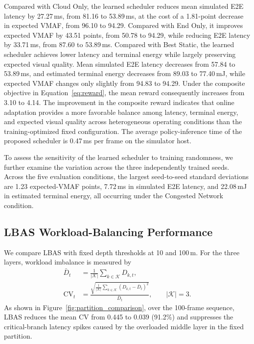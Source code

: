 \documentclass[acmsmall]{acmart}
\begin{document}
Compared with Cloud Only, the learned scheduler reduces mean simulated E2E latency by 27.27\,ms, from 81.16 to 53.89\,ms, at the cost of a 1.81-point decrease in expected VMAF, from 96.10 to 94.29. Compared with End Only, it improves expected VMAF by 43.51 points, from 50.78 to 94.29, while reducing E2E latency by 33.71\,ms, from 87.60 to 53.89\,ms. Compared with Best Static, the learned scheduler achieves lower latency and terminal energy while largely preserving expected visual quality. Mean simulated E2E latency decreases from 57.84 to 53.89\,ms, and estimated terminal energy decreases from 89.03 to 77.40\,mJ, while expected VMAF changes only slightly from 94.83 to 94.29. Under the composite objective in Equation~\ref{eq:reward}, the mean reward consequently increases from 3.10 to 4.14. The improvement in the composite reward indicates that online adaptation provides a more favorable balance among latency, terminal energy, and expected visual quality across heterogeneous operating conditions than the training-optimized fixed configuration. The average policy-inference time of the proposed scheduler is 0.47\,ms per frame on the simulator host.

To assess the sensitivity of the learned scheduler to training randomness, we further examine the variation across the three independently trained seeds. Across the five evaluation conditions, the largest seed-to-seed standard deviations are 1.23 expected-VMAF points, 7.72\,ms in simulated E2E latency, and 22.08\,mJ in estimated terminal energy, all occurring under the Congested Network condition.

\subsection{LBAS Workload-Balancing Performance}

We compare LBAS with fixed depth thresholds at 10 and 100\,m. For the three layers, workload imbalance is measured by
\begin{equation*}
	\begin{aligned}
	\bar D_t&=\frac{1}{|\mathcal{K}|}\sum_{k\in\mathcal{K}}D_{k,t},\\
	\mathrm{CV}_t&=\frac{\sqrt{\frac{1}{|\mathcal{K}|}\sum_{k\in\mathcal{K}}(D_{k,t}-\bar D_t)^2}}{\bar D_t},
	\qquad |\mathcal{K}|=3.
	\end{aligned}
\end{equation*}
As shown in Figure~\ref{fig:partition_comparison}, over the 100-frame sequence, LBAS reduces the mean CV from 0.445 to 0.039 (91.2\%) and suppresses the critical-branch latency spikes caused by the
overloaded middle layer in the fixed partition.
\end{document}
